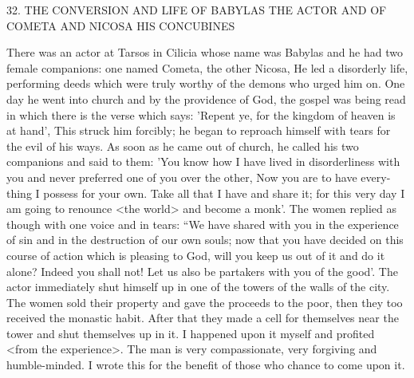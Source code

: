 32. THE CONVERSION AND LIFE OF BABYLAS
THE ACTOR AND OF COMETA AND NICOSA
HIS CONCUBINES

There was an actor at Tarsos in Cilicia whose name was Babylas
and he had two female companions: one named Cometa, the other
Nicosa, He led a disorderly life, performing deeds which were truly
worthy of the demons who urged him on. One day he went into
church and by the providence of God, the gospel was being read in
which there is the verse which says: 'Repent ye, for the kingdom of
heaven is at hand', This struck him forcibly; he began to reproach
himself with tears for the evil of his ways. As soon as he came out
of church, he called his two companions and said to them: 'You
know how I have lived in disorderliness with you and never
preferred one of you over the other, Now you are to have every-
thing I possess for your own. Take all that I have and share it; for
this very day I am going to renounce <the world> and become a
monk'. The women replied as though with one voice and in tears:
“We have shared with you in the experience of sin and in the
destruction of our own souls; now that you have decided on this
course of action which is pleasing to God, will you keep us out of
it and do it alone? Indeed you shall not! Let us also be partakers
with you of the good'. The actor immediately shut himself up in one
of the towers of the walls of the city. The women sold their property
and gave the proceeds to the poor, then they too received the
monastic habit. After that they made a cell for themselves near the
tower and shut themselves up in it. I happened upon it myself and
profited <from the experience>. The man is very compassionate,
very forgiving and humble-minded. I wrote this for the benefit of
those who chance to come upon it.

